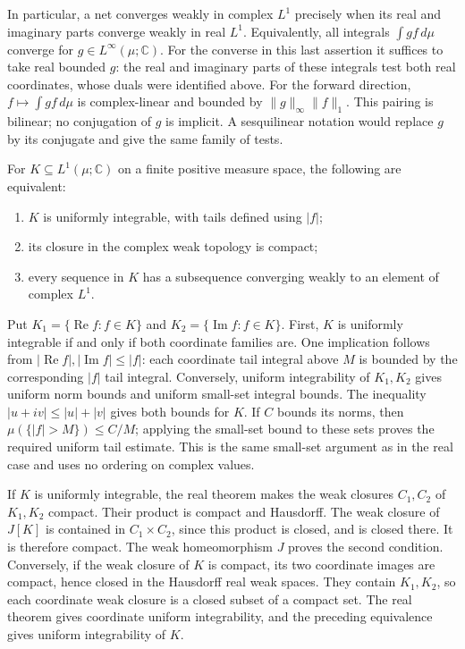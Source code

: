 In particular, a net converges weakly in complex $L^1$ precisely when
its real and imaginary parts converge weakly in real $L^1$. Equivalently,
all integrals $\int gf\,d\mu$ converge for $g\in L^\infty(\mu;\mathbb C)$.
For the converse in this last assertion it suffices to take real bounded
$g$: the real and imaginary parts of these integrals test both real
coordinates, whose duals were identified above. For the forward direction,
$f\mapsto\int gf\,d\mu$ is complex-linear and bounded by
$\|g\|_\infty\|f\|_1$. This pairing is bilinear; no conjugation of
$g$ is implicit. A sesquilinear notation would replace $g$ by its
conjugate and give the same family of tests.

\begin{theorem}
\label{thm:DP_complex_finite}
For $K\subseteq L^1(\mu;\mathbb C)$ on a finite positive measure space,
the following are equivalent:
\begin{enumerate}
\item $K$ is uniformly integrable, with tails defined using $|f|$;
\item its closure in the complex weak topology is compact;
\item every sequence in $K$ has a subsequence converging weakly to an
      element of complex $L^1$.
\end{enumerate}
\end{theorem}
\Proof
Put $K_1=\{\operatorname{Re}f:f\in K\}$ and
$K_2=\{\operatorname{Im}f:f\in K\}$. First, $K$ is uniformly
integrable if and only if both coordinate families are. One implication
follows from $|\operatorname{Re}f|,|\operatorname{Im}f|\leq|f|$:
each coordinate tail integral above $M$ is bounded by the corresponding
$|f|$ tail integral. Conversely, uniform integrability of $K_1,K_2$
gives uniform norm bounds and uniform small-set integral bounds.
The inequality $|u+iv|\leq|u|+|v|$ gives both bounds for $K$.
If $C$ bounds its norms, then
$\mu(\{|f|>M\})\leq C/M$; applying the small-set bound to these
sets proves the required uniform tail estimate. This is the same
small-set argument as in the real case and uses no ordering on complex
values.

If $K$ is uniformly integrable, the real theorem makes the weak closures
$C_1,C_2$ of $K_1,K_2$ compact. Their product is compact and Hausdorff.
The weak closure of $J[K]$ is contained in $C_1\times C_2$, since this
product is closed, and is closed there. It is therefore compact.
The weak homeomorphism $J$ proves the second condition. Conversely,
if the weak closure of $K$ is compact, its two coordinate images are
compact, hence closed in the Hausdorff real weak spaces. They contain
$K_1,K_2$, so each coordinate weak closure is a closed subset of a
compact set. The real theorem gives coordinate uniform integrability,
and the preceding equivalence gives uniform integrability of $K$.

